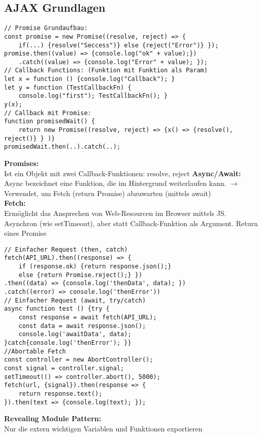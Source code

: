 \documentclass[7pt,landscape,a4paper]{scrartcl}
\begin{document}
\begin{multicols*}{4}
\subsection{AJAX Grundlagen}
\begin{lstlisting}[style=htmlcssjs]
// Promise Grundaufbau:
const promise = new Promise((resolve, reject) => {
	if(...) {resolve("Seccess")} else {reject("Error")} });
promise.then((value) => {console.log("ok" + value);})
	.catch((value) => {console.log("Error" + value); });
// Callback Functions: (Funktion mit Funktion als Param)
let x = function () {console.log("Callback"); }
let y = function (TestCallbackFn) {
	console.log("first"); TestCallbackFn(); }
y(x);
// Callback mit Promise:
function promisedWait() {
	return new Promise((resolve, reject) => {x() => {resolve(), reject()} } )}
promisedWait.then(..).catch(..);
\end{lstlisting}
	\textcolor{b}{\textbf{Promises:}}\\
	Ist ein Objekt mit zwei Callback-Funktionen: resolve, reject
	\textcolor{b}{\textbf{Async/Await:}}\\
	Async bezeichnet eine Funktion, die im Hintergrund weiterlaufen kann. $\rightarrow$ Verwendet, um Fetch (return Promise) abzuwarten (mittels await)\\
	\textcolor{b}{\textbf{Fetch:}}\\
	Ermöglicht das Ansprechen von Web-Resourcen im Browser mittels JS. Asynchron (wie setTimeout), aber statt Callback-Funktion als Argument. Return eines Promise
\begin{lstlisting}[style=htmlcssjs]
// Einfacher Request (then, catch)
fetch(API_URL).then((response) => {
	if (response.ok) {return response.json();}
	else {return Promise.reject();} })
.then((data) => {console.log('thenData', data); })
.catch((error) => console.log('thenError'))
// Einfacher Request (await, try/catch)
async function test () {try {
	const response = await fetch(API_URL);
	const data = await response.json();
	console.log('awaitData', data);
}catch{console.log('thenError'); }}
//Abortable Fetch
const controller = new AbortController();
const signal = controller.signal;
setTimeout(() => controller.abort(), 5000);
fetch(url, {signal}).then(response => {
	return response.text();
}).then(text => {console.log(text); });
\end{lstlisting}
	\textcolor{b}{\textbf{Revealing Module Pattern:}}\\
	Nur die extern wichtigen Variablen und Funktionen exportieren
\begin{lstlisting}[style=htmlcssjs]

\end{lstlisting}
\end{multicols*}
\end{document}
